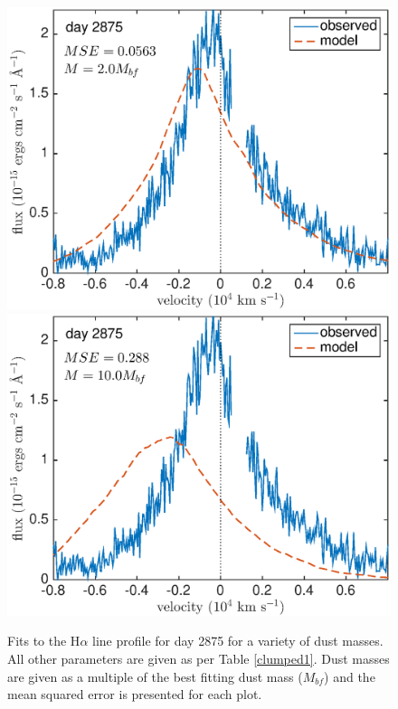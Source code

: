 \begin{figure}
\includegraphics[clip = true, scale=0.43, trim=10 0 45 0]{chapters/chapter5/images/MSE/d2875_M/d2875_M2}
\includegraphics[clip = true, scale=0.43, trim=42 0 45 0]{chapters/chapter5/images/MSE/d2875_M/d2875_M10}
\caption{Fits to the H$\alpha$ line profile for day 2875 for a variety of dust masses.  All other parameters are given as per Table \ref{clumped1}. Dust masses are given as a multiple of the best fitting dust mass ($M_{bf}$) and the mean squared error is presented for each plot.}
\end{figure}

